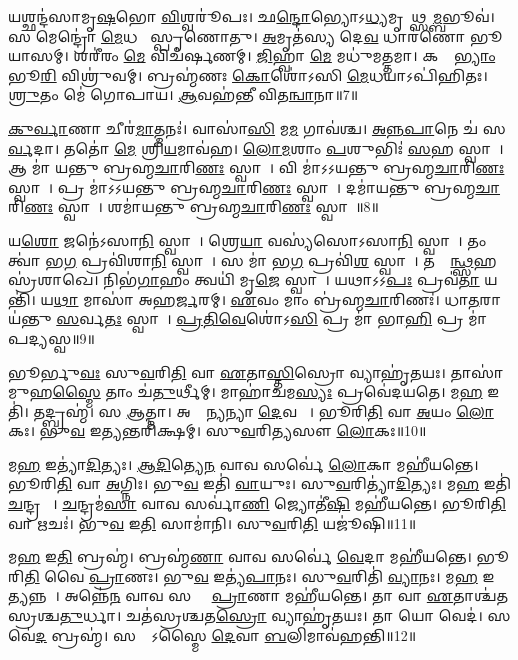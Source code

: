 𑌯𑌶𑍍𑌛𑌨𑍍𑌦॑𑌸𑌾𑌮𑍃\ul{𑌷}𑌭𑍋 \ul{𑌵𑌿}𑌶𑍍𑌵𑌰𑍂॑𑌪𑌃। 
𑌛\ul{𑌨𑍍𑌦𑍋}𑌭𑍍𑌯𑍋𑌽\ul{𑌧𑍍𑌯}𑌮𑍃𑌤𑌾᳚𑌥𑍍𑌸\ul{𑌮𑍍𑌬}𑌭𑍂𑌵॑। 
𑌸 𑌮𑍇𑌨𑍍𑌦𑍍𑌰𑍋॑ \ul{𑌮𑍇}𑌧𑌯𑌾᳚ 𑌸𑍍𑌪𑍃𑌣𑍋𑌤𑍁। 
\ul{𑌅}𑌮𑍃𑌤॑𑌸𑍍𑌯 𑌦𑍇\ul{𑌵} 𑌧𑌾𑌰॑𑌣𑍋 𑌭𑍂𑌯𑌾𑌸𑌮𑍍। 
𑌶𑌰𑍀॑𑌰𑌂 \ul{𑌮𑍇} 𑌵𑌿𑌚॑𑌰𑍍\mbox{}𑌷𑌣𑌮𑍍। 
\ul{𑌜𑌿}𑌹𑍍𑌵𑌾 \ul{𑌮𑍇} 𑌮𑌧𑍁॑𑌮𑌤𑍍𑌤𑌮𑌾। 
𑌕𑌰𑍍𑌣𑌾᳚\ul{𑌭𑍍𑌯𑌾𑌂} 𑌭𑍂\ul{𑌰𑌿} 𑌵𑌿𑌶𑍍𑌰𑍁॑𑌵𑌮𑍍। 
𑌬𑍍𑌰𑌹𑍍𑌮॑𑌣𑌃 \ul{𑌕𑍋}𑌶𑍋॑𑌽𑌸𑌿 \ul{𑌮𑍇}𑌧𑌯𑌾𑌽𑌪𑌿॑𑌹𑌿𑌤𑌃। 
\ul{𑌶𑍍𑌰𑍁}𑌤𑌂 𑌮𑍇॑ 𑌗𑍋𑌪𑌾𑌯। 
\ul{𑌆}𑌵𑌹॑𑌨𑍍𑌤𑍀 𑌵𑌿𑌤\ul{𑌨𑍍𑌵𑌾}𑌨𑌾॥7॥

\ul{𑌕𑍁}\ul{𑌰𑍍𑌵𑌾}𑌣𑌾 𑌚𑍀𑌰॑\ul{𑌮𑌾}𑌤𑍍𑌮𑌨𑌃॑। 
𑌵𑌾𑌸𑌾॑\ul{𑌸𑌿} 𑌮\ul{𑌮} 𑌗𑌾𑌵॑𑌶𑍍𑌚। 
\ul{𑌅}\ul{𑌨𑍍𑌨}\ul{𑌪𑌾}𑌨𑍇 𑌚॑ 𑌸\ul{𑌰𑍍𑌵}𑌦𑌾। 
𑌤𑌤𑍋॑ \ul{𑌮𑍇} 𑌶𑍍𑌰𑌿\ul{𑌯}𑌮𑌾𑌵॑𑌹। 
\ul{𑌲𑍋}\ul{𑌮}𑌶𑌾𑌂 \ul{𑌪}𑌶𑍁𑌭𑌿𑌃॑ \ul{𑌸}𑌹 𑌸𑍍𑌵𑌾𑌹𑌾᳚। 
𑌆 𑌮𑌾॑ 𑌯𑌨𑍍𑌤𑍁 𑌬𑍍𑌰𑌹𑍍𑌮\ul{𑌚𑌾}𑌰𑌿\ul{𑌣𑌃} 𑌸𑍍𑌵𑌾𑌹𑌾᳚। 
𑌵𑌿 𑌮𑌾॑𑌽𑌽𑌯𑌨𑍍𑌤𑍁 𑌬𑍍𑌰𑌹𑍍𑌮\ul{𑌚𑌾}𑌰𑌿\ul{𑌣𑌃} 𑌸𑍍𑌵𑌾𑌹𑌾᳚। 
𑌪𑍍𑌰 𑌮𑌾॑𑌽𑌽𑌯𑌨𑍍𑌤𑍁 𑌬𑍍𑌰𑌹𑍍𑌮\ul{𑌚𑌾}𑌰𑌿\ul{𑌣𑌃} 𑌸𑍍𑌵𑌾𑌹𑌾᳚। 
𑌦𑌮𑌾॑𑌯𑌨𑍍𑌤𑍁 𑌬𑍍𑌰𑌹𑍍𑌮\ul{𑌚𑌾}𑌰𑌿\ul{𑌣𑌃} 𑌸𑍍𑌵𑌾𑌹𑌾᳚। 
𑌶𑌮𑌾॑𑌯𑌨𑍍𑌤𑍁 𑌬𑍍𑌰𑌹𑍍𑌮\ul{𑌚𑌾}𑌰𑌿\ul{𑌣𑌃} 𑌸𑍍𑌵𑌾𑌹𑌾᳚॥8॥

𑌯\ul{𑌶𑍋} 𑌜𑌨𑍇॑𑌽𑌸𑌾\ul{𑌨𑌿} 𑌸𑍍𑌵𑌾𑌹𑌾᳚। 
𑌶𑍍𑌰𑍇\ul{𑌯𑌾}\an{} 𑌵𑌸𑍍𑌯॑𑌸𑍋𑌽𑌸𑌾\ul{𑌨𑌿} 𑌸𑍍𑌵𑌾𑌹𑌾᳚। 
𑌤𑌂 𑌤𑍍𑌵𑌾॑ 𑌭\ul{𑌗} 𑌪𑍍𑌰𑌵𑌿॑𑌶𑌾\ul{𑌨𑌿} 𑌸𑍍𑌵𑌾𑌹𑌾᳚। 
𑌸 𑌮𑌾॑ 𑌭\ul{𑌗} 𑌪𑍍𑌰𑌵𑌿॑\ul{𑌶} 𑌸𑍍𑌵𑌾𑌹𑌾᳚। 
𑌤𑌸𑍍𑌮𑌿᳚\ul{𑌨𑍍𑌥𑍍𑌸}𑌹𑌸𑍍𑌰॑𑌶𑌾𑌖𑍇। 
𑌨𑌿𑌭॑\ul{𑌗𑌾}𑌹𑌂 𑌤𑍍𑌵𑌯𑌿॑ 𑌮𑍃\ul{𑌜𑍇} 𑌸𑍍𑌵𑌾𑌹𑌾᳚। 
𑌯𑌥𑌾𑌽𑌽\ul{𑌪𑌃} 𑌪𑍍𑌰𑌵॑\ul{𑌤𑌾} 𑌯𑌨𑍍𑌤𑌿॑। 
𑌯\ul{𑌥𑌾} 𑌮𑌾𑌸𑌾॑ 𑌅𑌹\ul{𑌰𑍍𑌜}𑌰𑌮𑍍। 
\ul{𑌏}𑌵𑌂 𑌮𑌾𑌂 𑌬𑍍𑌰॑𑌹𑍍𑌮\ul{𑌚𑌾}𑌰𑌿𑌣𑌃॑। 
𑌧𑌾\ul{𑌤}𑌰𑌾𑌯॑𑌨𑍍𑌤𑍁 \ul{𑌸}𑌰𑍍𑌵\ul{𑌤𑌃} 𑌸𑍍𑌵𑌾𑌹𑌾᳚। 
\ul{𑌪𑍍𑌰}\ul{𑌤𑌿}\ul{𑌵𑍇}𑌶𑍋॑𑌽\ul{𑌸𑌿} 𑌪𑍍𑌰 𑌮𑌾॑ 𑌭𑌾\ul{𑌹𑌿} 𑌪𑍍𑌰 𑌮𑌾॑ 𑌪𑌦𑍍𑌯𑌸𑍍𑌵॥9॥
\anuvakamend%

𑌭𑍂𑌰𑍍𑌭𑍁\ul{𑌵𑌃} 𑌸𑍁\ul{𑌵}𑌰𑌿\ul{𑌤𑌿} 𑌵𑌾 \ul{𑌏}𑌤𑌾\ul{𑌸𑍍𑌤𑌿}𑌸𑍍𑌰𑍋 𑌵𑍍𑌯𑌾𑌹𑍃॑𑌤𑌯𑌃। 
𑌤𑌾𑌸𑌾॑𑌮𑍁𑌹\ul{𑌸𑍍𑌮𑍈} 𑌤𑌾𑌂 𑌚॑\ul{𑌤𑍁}𑌰𑍍𑌥𑍀𑌮𑍍। 
𑌮𑌾𑌹𑌾॑𑌚𑌮\ul{𑌸𑍍𑌯𑌃} 𑌪𑍍𑌰𑌵𑍇॑𑌦𑌯𑌤𑍇। 
𑌮\ul{𑌹} 𑌇𑌤𑌿॑। 
𑌤𑌦𑍍𑌬𑍍𑌰𑌹𑍍𑌮॑। 
𑌸 \ul{𑌆}𑌤𑍍𑌮𑌾। 
𑌅𑌙𑍍𑌗𑌾᳚\ul{𑌨𑍍𑌯}𑌨𑍍𑌯𑌾 \ul{𑌦𑍇}𑌵𑌤𑌾𑌃᳚। 
𑌭𑍂𑌰𑌿\ul{𑌤𑌿} 𑌵𑌾 \ul{𑌅}𑌯𑌂 \ul{𑌲𑍋}𑌕𑌃। 
𑌭𑍁\ul{𑌵} 𑌇\ul{𑌤𑍍𑌯}𑌨𑍍𑌤𑌰𑌿॑𑌕𑍍𑌷𑌮𑍍। 
𑌸𑍁\ul{𑌵}𑌰𑌿\ul{𑌤𑍍𑌯}𑌸𑍗 \ul{𑌲𑍋}𑌕𑌃॥10॥

𑌮\ul{𑌹} 𑌇𑌤𑍍𑌯𑌾॑\ul{𑌦𑌿}𑌤𑍍𑌯𑌃। 
\ul{𑌆}\ul{𑌦𑌿}𑌤𑍍𑌯𑍇\ul{𑌨} 𑌵𑌾𑌵 𑌸𑌰𑍍𑌵𑍇॑ \ul{𑌲𑍋}𑌕𑌾 𑌮𑌹𑍀॑𑌯𑌨𑍍𑌤𑍇। 
𑌭𑍂𑌰𑌿\ul{𑌤𑌿} 𑌵𑌾 \ul{𑌅}𑌗𑍍𑌨𑌿𑌃। 
𑌭𑍁\ul{𑌵} 𑌇𑌤𑌿॑ \ul{𑌵𑌾}𑌯𑍁𑌃। 
𑌸𑍁\ul{𑌵}𑌰𑌿𑌤𑍍𑌯𑌾॑\ul{𑌦𑌿}𑌤𑍍𑌯𑌃। 
𑌮\ul{𑌹} 𑌇𑌤𑌿॑ \ul{𑌚}𑌨𑍍𑌦𑍍𑌰𑌮𑌾𑌃᳚। 
\ul{𑌚}𑌨𑍍𑌦𑍍𑌰𑌮॑\ul{𑌸𑌾} 𑌵𑌾𑌵 𑌸𑌰𑍍𑌵𑌾॑\ul{𑌣𑌿} 𑌜𑍍𑌯𑍋𑌤𑍀॑\ul{𑌷𑌿} 𑌮𑌹𑍀॑𑌯𑌨𑍍𑌤𑍇। 
𑌭𑍂𑌰𑌿\ul{𑌤𑌿} 𑌵𑌾 𑌋𑌚𑌃॑। 
𑌭𑍁\ul{𑌵} 𑌇\ul{𑌤𑌿} 𑌸𑌾𑌮𑌾॑𑌨𑌿। 
𑌸𑍁\ul{𑌵}𑌰𑌿\ul{𑌤𑌿} 𑌯𑌜𑍂॑𑌷𑌿॥11॥

𑌮\ul{𑌹} 𑌇\ul{𑌤𑌿} 𑌬𑍍𑌰𑌹𑍍𑌮॑। 
𑌬𑍍𑌰𑌹𑍍𑌮॑\ul{𑌣𑌾} 𑌵𑌾𑌵 𑌸𑌰𑍍𑌵𑍇॑ \ul{𑌵𑍇}𑌦𑌾 𑌮𑌹𑍀॑𑌯𑌨𑍍𑌤𑍇। 
𑌭𑍂𑌰𑌿\ul{𑌤𑌿} 𑌵𑍈 \ul{𑌪𑍍𑌰𑌾}𑌣𑌃। 
𑌭𑍁\ul{𑌵} 𑌇𑌤𑍍𑌯॑\ul{𑌪𑌾}𑌨𑌃। 
𑌸𑍁\ul{𑌵}𑌰𑌿𑌤𑌿॑ \ul{𑌵𑍍𑌯𑌾}𑌨𑌃। 
𑌮\ul{𑌹} 𑌇𑌤𑍍𑌯𑌨𑍍𑌨𑌮𑍍᳚। 
𑌅𑌨𑍍𑌨𑍇॑\ul{𑌨} 𑌵𑌾𑌵 𑌸𑌰𑍍𑌵𑍇᳚ \ul{𑌪𑍍𑌰𑌾}𑌣𑌾 𑌮𑌹𑍀॑𑌯𑌨𑍍𑌤𑍇। 
𑌤𑌾 𑌵𑌾 \ul{𑌏}𑌤𑌾𑌶𑍍𑌚॑𑌤𑌸𑍍𑌰𑌶𑍍𑌚\ul{𑌤𑍁}𑌰𑍍𑌧𑌾। 
𑌚𑌤॑𑌸𑍍𑌰𑌶𑍍𑌚𑌤\ul{𑌸𑍍𑌰𑍋} 𑌵𑍍𑌯𑌾𑌹𑍃॑𑌤𑌯𑌃। 
𑌤𑌾 𑌯𑍋 𑌵𑍇𑌦॑। 
𑌸 𑌵𑍇॑\ul{𑌦} 𑌬𑍍𑌰𑌹𑍍𑌮॑। 
𑌸𑌰𑍍𑌵𑍇᳚𑌽𑌸𑍍𑌮𑍈 \ul{𑌦𑍇}𑌵𑌾 \ul{𑌬}𑌲𑌿𑌮𑌾𑌵॑𑌹𑌨𑍍𑌤𑌿॥12॥
\anuvakamend[\ul{𑌅}𑌸𑍗 \ul{𑌲𑍋}𑌕𑍋 𑌯𑌜𑍂\dng{ꣳ}॑\ul{𑌷𑌿} 𑌵𑍇\ul{𑌦} 𑌦𑍍𑌵𑍇 𑌚॑]

